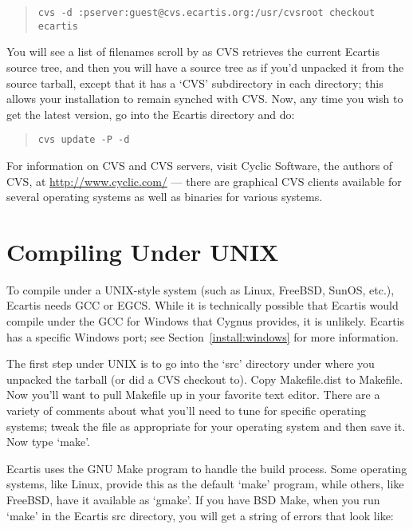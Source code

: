 \documentclass{book}
\begin{document}
\begin{quote}
\footnotesize
\begin{verbatim}
cvs -d :pserver:guest@cvs.ecartis.org:/usr/cvsroot checkout ecartis
\end{verbatim}
\end{quote}
   
You will see a list of filenames scroll by as CVS retrieves the current Ecartis
source tree, and then you will have a source tree as if you'd unpacked it from
the source tarball, except that it has a `CVS' subdirectory in each directory;
this allows your installation to remain synched with CVS.  Now, any time you
wish to get the latest version, go into the Ecartis directory and do:
   
\begin{quote}
\footnotesize
\begin{verbatim}
cvs update -P -d
\end{verbatim}
\end{quote}

For information on CVS and CVS servers, visit Cyclic Software, the authors of
CVS, at \href{http://www.cyclic.com/}{http://www.cyclic.com/} --- there are graphical CVS clients
available for several operating systems as well as binaries for various
systems.
   
\section{Compiling Under UNIX}
\label{install:unix}

To compile under a UNIX-style system (such as Linux, FreeBSD, SunOS, etc.),
Ecartis needs GCC or EGCS.  While it is technically possible that Ecartis would
compile under the GCC for Windows that Cygnus provides, it is unlikely.
Ecartis has a specific Windows port; see Section~\ref{install:windows} for more
information.

The first step under UNIX is to go into the `src' directory under where you
unpacked the tarball (or did a CVS checkout to).  Copy Makefile.dist to
Makefile.  Now you'll want to pull Makefile up in your favorite text editor.
There are a variety of comments about what you'll need to tune for specific
operating systems; tweak the file as appropriate for your operating system and
then save it.  Now type `make'.
   
Ecartis uses the GNU Make program to handle the build process.  Some operating
systems, like Linux, provide this as the default `make' program, while others,
like FreeBSD, have it available as `gmake'.  If you have BSD Make, when you
run `make' in the Ecartis src directory, you will get a string of errors that
look like:
\end{document}
